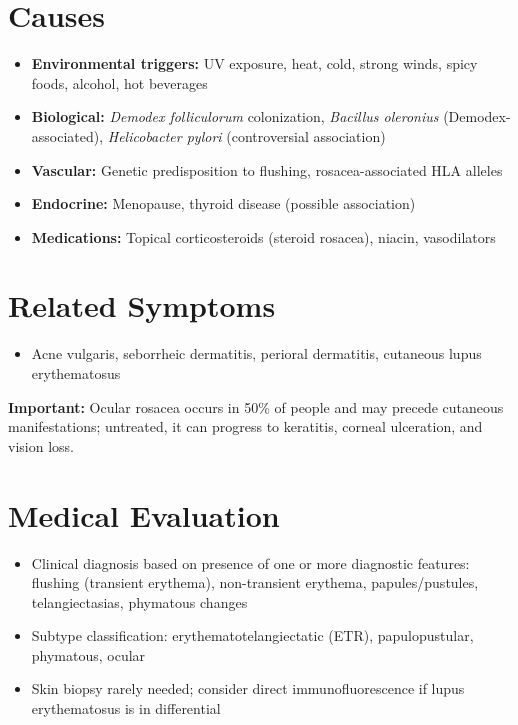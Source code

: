 \section*{Causes}
\begin{itemize}
  \item \textbf{Environmental triggers:} UV exposure, heat, cold, strong winds, spicy foods, alcohol, hot beverages
  \item \textbf{Biological:} \textit{Demodex folliculorum} colonization, \textit{Bacillus oleronius} (Demodex-associated), \textit{Helicobacter pylori} (controversial association)
  \item \textbf{Vascular:} Genetic predisposition to flushing, rosacea-associated HLA alleles
  \item \textbf{Endocrine:} Menopause, thyroid disease (possible association)
  \item \textbf{Medications:} Topical corticosteroids (steroid rosacea), niacin, vasodilators
\end{itemize}

\section*{Related Symptoms}
\begin{itemize}
  \item Acne vulgaris, seborrheic dermatitis, perioral dermatitis, cutaneous lupus erythematosus
\end{itemize}
\textbf{Important:} Ocular rosacea occurs in 50\% of people and may precede cutaneous manifestations; untreated, it can progress to keratitis, corneal ulceration, and vision loss.

\section*{Medical Evaluation}
\begin{itemize}
  \item Clinical diagnosis based on presence of one or more diagnostic features: flushing (transient erythema), non-transient erythema, papules/pustules, telangiectasias, phymatous changes
  \item Subtype classification: erythematotelangiectatic (ETR), papulopustular, phymatous, ocular
  \item Skin biopsy rarely needed; consider direct immunofluorescence if lupus erythematosus is in differential
\end{itemize}

